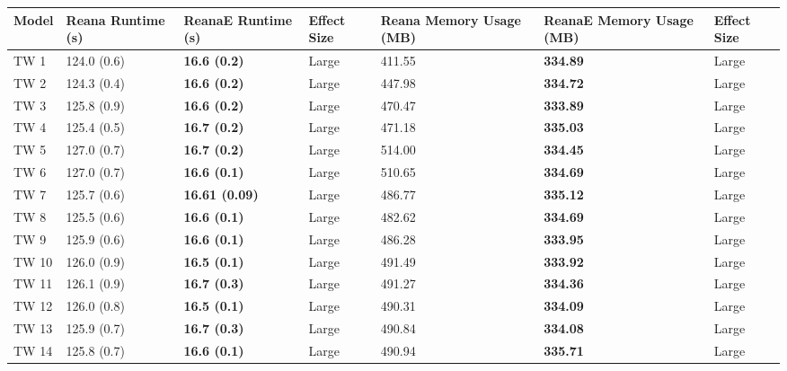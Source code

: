 \begin{tabular}{lllllll}
\toprule
 Model & Reana Runtime (s) &     ReanaE Runtime (s) & Effect Size & Reana Memory Usage (MB) & ReanaE Memory Usage (MB) & Effect Size \\
\midrule
  TW 1 &       124.0 (0.6) &    \textbf{16.6 (0.2)} &       Large &                  411.55 &          \textbf{334.89} &       Large \\
  TW 2 &       124.3 (0.4) &    \textbf{16.6 (0.2)} &       Large &                  447.98 &          \textbf{334.72} &       Large \\
  TW 3 &       125.8 (0.9) &    \textbf{16.6 (0.2)} &       Large &                  470.47 &          \textbf{333.89} &       Large \\
  TW 4 &       125.4 (0.5) &    \textbf{16.7 (0.2)} &       Large &                  471.18 &          \textbf{335.03} &       Large \\
  TW 5 &       127.0 (0.7) &    \textbf{16.7 (0.2)} &       Large &                  514.00 &          \textbf{334.45} &       Large \\
  TW 6 &       127.0 (0.7) &    \textbf{16.6 (0.1)} &       Large &                  510.65 &          \textbf{334.69} &       Large \\
  TW 7 &       125.7 (0.6) &  \textbf{16.61 (0.09)} &       Large &                  486.77 &          \textbf{335.12} &       Large \\
  TW 8 &       125.5 (0.6) &    \textbf{16.6 (0.1)} &       Large &                  482.62 &          \textbf{334.69} &       Large \\
  TW 9 &       125.9 (0.6) &    \textbf{16.6 (0.1)} &       Large &                  486.28 &          \textbf{333.95} &       Large \\
 TW 10 &       126.0 (0.9) &    \textbf{16.5 (0.1)} &       Large &                  491.49 &          \textbf{333.92} &       Large \\
 TW 11 &       126.1 (0.9) &    \textbf{16.7 (0.3)} &       Large &                  491.27 &          \textbf{334.36} &       Large \\
 TW 12 &       126.0 (0.8) &    \textbf{16.5 (0.1)} &       Large &                  490.31 &          \textbf{334.09} &       Large \\
 TW 13 &       125.9 (0.7) &    \textbf{16.7 (0.3)} &       Large &                  490.84 &          \textbf{334.08} &       Large \\
 TW 14 &       125.8 (0.7) &    \textbf{16.6 (0.1)} &       Large &                  490.94 &          \textbf{335.71} &       Large \\

\end{tabular}
